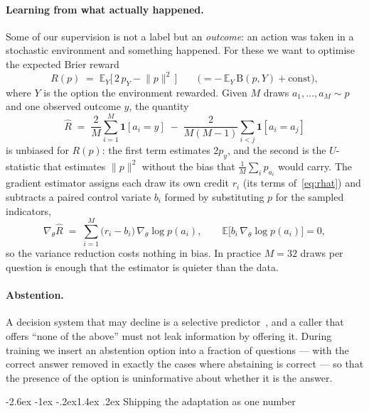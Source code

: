 \documentclass[11pt]{article}
\makeatletter
\renewcommand\subsection{\@startsection{subsection}{2}{\z@}%
  {-2.6ex \@plus -1ex \@minus -.2ex}{1.4ex \@plus.2ex}%
  {\normalfont\normalsize\bfseries\color{accent!85!black}}}
\newcommand{\1}{\mathbf{1}}
\makeatother
\begin{document}
\paragraph{Learning from what actually happened.} Some of our supervision is not a label but an
\emph{outcome}: an action was taken in a stochastic environment and something happened. For these we
want to optimise the expected Brier reward
\begin{equation}
R(p) \;=\; \mathbb{E}_{Y}\big[\,2\,p_Y - \lVert p \rVert^2\,\big]
\qquad
\big(= -\,\mathbb{E}_Y\,\mathrm{B}(p, Y) + \text{const}\big),
\end{equation}
where $Y$ is the option the environment rewarded. Given $M$ draws $a_1,\dots,a_M \sim p$ and one
observed outcome $y$, the quantity
\begin{equation}
\widehat{R}
\;=\;
\frac{2}{M}\sum_{i=1}^{M} \1[a_i = y]
\;-\;
\frac{2}{M(M-1)}\sum_{i<j} \1[a_i = a_j]
\label{eq:rhat}
\end{equation}
is unbiased for $R(p)$: the first term estimates $2p_y$, and the second is the $U$-statistic that
estimates $\lVert p \rVert^2$ without the bias that $\frac{1}{M}\sum_i p_{a_i}$ would carry. The
gradient estimator assigns each draw its own credit $r_i$ (its terms of~\eqref{eq:rhat}) and
subtracts a paired control variate $b_i$ formed by substituting $p$ for the sampled indicators,
\begin{equation}
\nabla_\theta \widehat{R}
\;=\;
\sum_{i=1}^{M} \big(r_i - b_i\big)\,\nabla_\theta \log p(a_i),
\qquad
\mathbb{E}\big[b_i \,\nabla_\theta \log p(a_i)\big] = 0 ,
\end{equation}
so the variance reduction costs nothing in bias. In practice $M = 32$ draws per question is enough
that the estimator is quieter than the data.

\paragraph{Abstention.} A decision system that may decline is a selective
predictor~\cite{geifman2017selective,el2024leave}, and a caller that offers ``none of the above''
must not leak information by offering it. During training we insert an abstention option into a fraction of questions --- with
the correct answer removed in exactly the cases where abstaining is correct --- so that the presence
of the option is uninformative about whether it is the answer.

\subsection{Shipping the adaptation as one number}
\label{sec:lambda}
\end{document}
